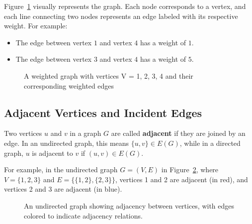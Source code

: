 Figure~\ref{fig:weighted_graph} visually represents the graph. Each node corresponds to a vertex, and each line connecting two nodes represents an edge labeled with its respective weight. For example:
\begin{itemize}
    \item The edge between vertex \( 1 \) and vertex \( 4 \) has a weight of \( 1 \).
    \item The edge between vertex \( 3 \) and vertex \( 4 \) has a weight of \( 5 \).
\end{itemize} 

\begin{figure}[h]
\begin{center}
\caption{A weighted graph with vertices V = 1, 2, 3, 4 and their corresponding weighted edges}
\label{fig:weighted_graph}
\end{center}
\end{figure}

\subsection{Adjacent Vertices and Incident Edges}

Two vertices \( u \) and \( v \) in a graph \( G \) are called \textbf{adjacent} if they are joined by an edge. In an undirected graph, this means \( \{u, v\} \in E(G) \), while in a directed graph, \( u \) is adjacent to \( v \) if \( (u, v) \in E(G) \).

For example, in the undirected graph \( G = (V, E) \) in Figure~\ref{fig:adj_vertices}, where \( V = \{1, 2, 3\} \) and \( E = \{\{1, 2\}, \{2, 3\}\} \), vertices 1 and 2 are adjacent (in red), and vertices 2 and 3 are adjacent (in blue).

\begin{figure}[h]
\begin{center}
\caption{An undirected graph showing adjacency between vertices, with edges colored to indicate adjacency relations.}
\label{fig:adj_vertices}
\end{center}
\end{figure}

